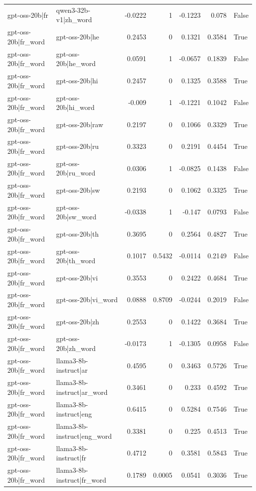 \begin{table}
\begin{tabular}{l l r r r r l}
gpt-oss-20b|fr & qwen3-32b-v1|zh_word & -0.0222 & 1 & -0.1223 & 0.078 & False \\
gpt-oss-20b|fr_word & gpt-oss-20b|he & 0.2453 & 0 & 0.1321 & 0.3584 & True \\
gpt-oss-20b|fr_word & gpt-oss-20b|he_word & 0.0591 & 1 & -0.0657 & 0.1839 & False \\
gpt-oss-20b|fr_word & gpt-oss-20b|hi & 0.2457 & 0 & 0.1325 & 0.3588 & True \\
gpt-oss-20b|fr_word & gpt-oss-20b|hi_word & -0.009 & 1 & -0.1221 & 0.1042 & False \\
gpt-oss-20b|fr_word & gpt-oss-20b|raw & 0.2197 & 0 & 0.1066 & 0.3329 & True \\
gpt-oss-20b|fr_word & gpt-oss-20b|ru & 0.3323 & 0 & 0.2191 & 0.4454 & True \\
gpt-oss-20b|fr_word & gpt-oss-20b|ru_word & 0.0306 & 1 & -0.0825 & 0.1438 & False \\
gpt-oss-20b|fr_word & gpt-oss-20b|sw & 0.2193 & 0 & 0.1062 & 0.3325 & True \\
gpt-oss-20b|fr_word & gpt-oss-20b|sw_word & -0.0338 & 1 & -0.147 & 0.0793 & False \\
gpt-oss-20b|fr_word & gpt-oss-20b|th & 0.3695 & 0 & 0.2564 & 0.4827 & True \\
gpt-oss-20b|fr_word & gpt-oss-20b|th_word & 0.1017 & 0.5432 & -0.0114 & 0.2149 & False \\
gpt-oss-20b|fr_word & gpt-oss-20b|vi & 0.3553 & 0 & 0.2422 & 0.4684 & True \\
gpt-oss-20b|fr_word & gpt-oss-20b|vi_word & 0.0888 & 0.8709 & -0.0244 & 0.2019 & False \\
gpt-oss-20b|fr_word & gpt-oss-20b|zh & 0.2553 & 0 & 0.1422 & 0.3684 & True \\
gpt-oss-20b|fr_word & gpt-oss-20b|zh_word & -0.0173 & 1 & -0.1305 & 0.0958 & False \\
gpt-oss-20b|fr_word & llama3-8b-instruct|ar & 0.4595 & 0 & 0.3463 & 0.5726 & True \\
gpt-oss-20b|fr_word & llama3-8b-instruct|ar_word & 0.3461 & 0 & 0.233 & 0.4592 & True \\
gpt-oss-20b|fr_word & llama3-8b-instruct|eng & 0.6415 & 0 & 0.5284 & 0.7546 & True \\
gpt-oss-20b|fr_word & llama3-8b-instruct|eng_word & 0.3381 & 0 & 0.225 & 0.4513 & True \\
gpt-oss-20b|fr_word & llama3-8b-instruct|fr & 0.4712 & 0 & 0.3581 & 0.5843 & True \\
gpt-oss-20b|fr_word & llama3-8b-instruct|fr_word & 0.1789 & 0.0005 & 0.0541 & 0.3036 & True \\

\end{tabular}
\end{table}
